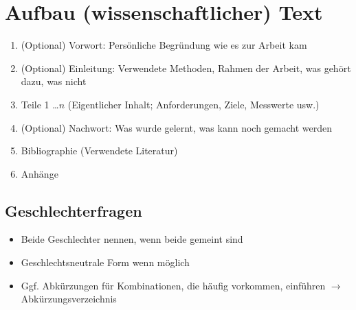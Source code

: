 \section{Aufbau (wissenschaftlicher) Text}
\begin{enumerate}\itemsep0em
	\item (Optional) Vorwort: Persönliche Begründung wie es zur Arbeit kam
	\item (Optional) Einleitung: Verwendete Methoden, Rahmen der Arbeit, was gehört dazu, was nicht
	\item Teile 1 \dots $n$ (Eigentlicher Inhalt; Anforderungen, Ziele, Messwerte usw.)
	\item (Optional) Nachwort: Was wurde gelernt, was kann noch gemacht werden
	\item Bibliographie (Verwendete Literatur)
	\item Anhänge
\end{enumerate}

\subsection{Geschlechterfragen}
\begin{itemize}\itemsep0em
	\item Beide Geschlechter nennen, wenn beide gemeint sind
	\item Geschlechtsneutrale Form wenn möglich
	\item Ggf. Abkürzungen für Kombinationen, die häufig vorkommen, einführen $\rightarrow$ Abkürzungsverzeichnis
\end{itemize}



